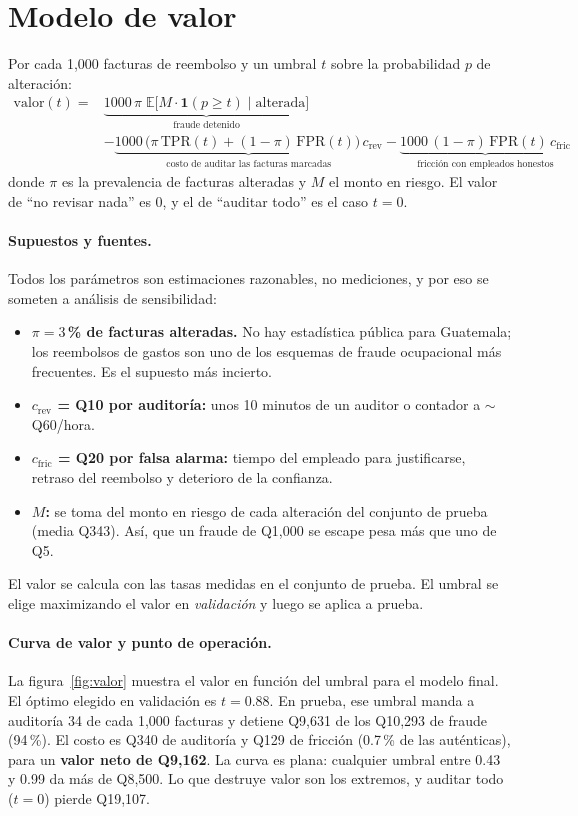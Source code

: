 \documentclass[11pt,letterpaper]{article}
\begin{document}
\section{Modelo de valor}
\label{sec:valor}

Por cada 1,000 facturas de reembolso y un umbral $t$ sobre la probabilidad $p$ de alteración:
\begin{align*}
\text{valor}(t) ={} & \underbrace{1000\,\pi\;\mathbb{E}\big[M\cdot\mathbf{1}(p\ge t)\mid\text{alterada}\big]}_{\text{fraude detenido}}\\
 & -\underbrace{1000\,\big(\pi\,\mathrm{TPR}(t)+(1-\pi)\,\mathrm{FPR}(t)\big)\,c_{\text{rev}}}_{\text{costo de auditar las facturas marcadas}}
   -\underbrace{1000\,(1-\pi)\,\mathrm{FPR}(t)\,c_{\text{fric}}}_{\text{fricción con empleados honestos}}
\end{align*}
donde $\pi$ es la prevalencia de facturas alteradas y $M$ el monto en riesgo. El valor de ``no revisar nada'' es 0, y el de ``auditar todo'' es el caso $t=0$.

\paragraph{Supuestos y fuentes.} Todos los parámetros son estimaciones razonables, no mediciones, y por eso se someten a análisis de sensibilidad:
\begin{itemize}
  \item \textbf{$\pi = 3$\,\% de facturas alteradas.} No hay estadística pública para Guatemala; los reembolsos de gastos son uno de los esquemas de fraude ocupacional más frecuentes. Es el supuesto más incierto.
  \item \textbf{$c_{\text{rev}}$ = Q10 por auditoría:} unos 10 minutos de un auditor o contador a ${\sim}$Q60/hora.
  \item \textbf{$c_{\text{fric}}$ = Q20 por falsa alarma:} tiempo del empleado para justificarse, retraso del reembolso y deterioro de la confianza.
  \item \textbf{$M$:} se toma del monto en riesgo de cada alteración del conjunto de prueba (media Q343). Así, que un fraude de Q1,000 se escape pesa más que uno de Q5.
\end{itemize}
El valor se calcula con las tasas medidas en el conjunto de prueba. El umbral se elige maximizando el valor en \emph{validación} y luego se aplica a prueba.

\paragraph{Curva de valor y punto de operación.} La figura~\ref{fig:valor} muestra el valor en función del umbral para el modelo final. El óptimo elegido en validación es $t=0.88$. En prueba, ese umbral manda a auditoría 34 de cada 1,000 facturas y detiene Q9,631 de los Q10,293 de fraude (94\,\%). El costo es Q340 de auditoría y Q129 de fricción (0.7\,\% de las auténticas), para un \textbf{valor neto de Q9,162}. La curva es plana: cualquier umbral entre 0.43 y 0.99 da más de Q8,500. Lo que destruye valor son los extremos, y auditar todo ($t=0$) pierde Q19,107.
\end{document}
